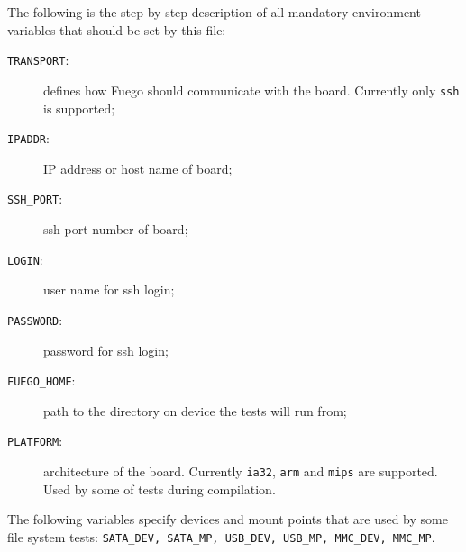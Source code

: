 The following is the step-by-step description of all mandatory environment variables that should be set by this file:

\begin{description}
\item[\texttt{TRANSPORT}:] defines how Fuego should communicate with the board. 
  Currently only \texttt{ssh} is supported;
\item[\texttt{IPADDR}:]  IP address or host name of board;
\item[\texttt{SSH\_PORT}:]  ssh port number of board;
\item[\texttt{LOGIN}:]  user name for ssh login;
\item[\texttt{PASSWORD}:] password for ssh login;
\item[\texttt{FUEGO\_HOME}:] path to the directory on device the tests will run from;
\item[\texttt{PLATFORM}:] architecture of the board. 
  Currently \texttt{ia32}, \texttt{arm} and \texttt{mips} are supported. Used by some of tests during compilation.
\end{description}

The following variables specify devices and mount points that are used by some 
file system tests: \texttt{SATA\_DEV, SATA\_MP, USB\_DEV, USB\_MP, MMC\_DEV, MMC\_MP}.




